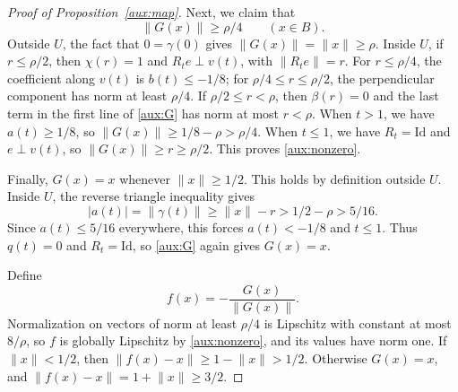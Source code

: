 \documentclass[11pt]{article}
\newcommand{\norm}[1]{\lVert #1\rVert}
\theoremstyle{definition}
\numberwithin{equation}{section}
\begin{document}
\begin{proof}[Proof of Proposition~\ref{aux:map}]
Next, we claim that
\begin{equation}\label{aux:nonzero}
 \norm{G(x)}\ge\rho/4\qquad(x\in B).
\end{equation}
Outside $U$, the fact that $0=\gamma(0)$ gives
$\norm{G(x)}=\norm{x}\ge\rho$. Inside $U$, if $r\le\rho/2$, then
$\chi(r)=1$ and $R_te\perp v(t)$, with $\norm{R_te}=r$. For
$r\le\rho/4$, the coefficient along $v(t)$ is $b(t)\le-1/8$;
for $\rho/4\le r\le\rho/2$, the perpendicular component has norm
at least $\rho/4$. If $\rho/2\le r<\rho$, then $\beta(r)=0$ and
the last term in the first line of \eqref{aux:G} has norm at most
$r<\rho$. When $t>1$, we have $a(t)\ge1/8$, so
$\norm{G(x)}\ge1/8-\rho>\rho/4$. When $t\le1$, we have
$R_t=\mathrm{Id}$ and $e\perp v(t)$, so
$\norm{G(x)}\ge r\ge\rho/2$. This proves \eqref{aux:nonzero}.

Finally, $G(x)=x$ whenever $\norm{x}\ge1/2$. This holds by definition
outside $U$. Inside $U$, the reverse triangle inequality gives
\[
 |a(t)|=\norm{\gamma(t)}\ge\norm{x}-r>1/2-\rho>5/16.
\]
Since $a(t)\le5/16$ everywhere, this forces $a(t)<-1/8$ and $t\le1$.
Thus $q(t)=0$ and $R_t=\mathrm{Id}$, so \eqref{aux:G} again gives
$G(x)=x$.

Define
\[
 f(x)=-\frac{G(x)}{\norm{G(x)}}.
\]
Normalization on vectors of norm at least $\rho/4$ is Lipschitz with
constant at most $8/\rho$, so $f$ is globally Lipschitz by
\eqref{aux:nonzero}, and its values have norm one. If
$\norm{x}<1/2$, then $\norm{f(x)-x}\ge1-\norm{x}>1/2$.
Otherwise $G(x)=x$, and
$\norm{f(x)-x}=1+\norm{x}\ge3/2$.
\end{proof}




\end{document}
